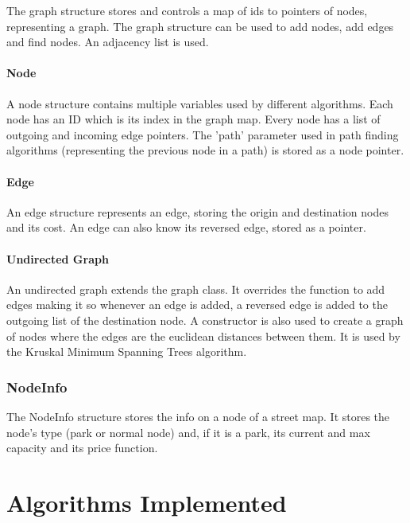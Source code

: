 \documentclass[a4paper, 12pt]{report}
\begin{document}
    The graph structure stores and controls a map of ids to pointers of nodes, representing a graph. The graph structure can be used to add nodes, add edges and find nodes. An adjacency list is used.
    
    \subsubsection{Node}
    
    A node structure contains multiple variables used by different algorithms. Each node has an ID which is its index in the graph map. Every node has a list of outgoing and incoming edge pointers. The 'path' parameter used in path finding algorithms (representing the previous node in a path) is stored as a node pointer.
    
    \subsubsection{Edge}
    
    An edge structure represents an edge, storing the origin and destination nodes and its cost. An edge can also know its reversed edge, stored as a pointer.
    
    \subsubsection{Undirected Graph}
    
    An undirected graph extends the graph class. It overrides the function to add edges making it so whenever an edge is added, a reversed edge is added to the outgoing list of the destination node. A constructor is also used to create a graph of nodes where the edges are the euclidean distances between them. It is used by the Kruskal Minimum Spanning Trees algorithm.
    
    \subsection{NodeInfo}
    
    The NodeInfo structure stores the info on a node of a street map. It stores the node's type (park or normal node) and, if it is a park, its current and max capacity and its price function.
    
    
    \chapter{Algorithms Implemented} %
    
\end{document}
